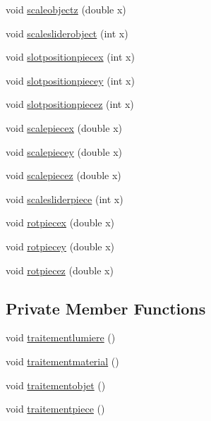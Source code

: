 \begin{DoxyCompactItemize}
void \hyperlink{class_mondock_a1f5430731565a79314d90de605741e75}{scaleobjectz} (double x)
\item 
void \hyperlink{class_mondock_a0b0dfd777e3a4ee9f4ac65ab44b02fca}{scalesliderobject} (int x)
\item 
void \hyperlink{class_mondock_aab1b5fe42325904c90cb7ea01d20dda3}{slotpositionpiecex} (int x)
\item 
void \hyperlink{class_mondock_aa9b2f07da91515f13c0dc217d24357ba}{slotpositionpiecey} (int x)
\item 
void \hyperlink{class_mondock_a655881c708869d768f1488d6fa066dc6}{slotpositionpiecez} (int x)
\item 
void \hyperlink{class_mondock_a9f2a071406501e4fccde215bc38d8df9}{scalepiecex} (double x)
\item 
void \hyperlink{class_mondock_a4ac3bc0b53096e41379ac7ef64de9d2d}{scalepiecey} (double x)
\item 
void \hyperlink{class_mondock_afd3ea421e6df4deac7930ed476556aa4}{scalepiecez} (double x)
\item 
void \hyperlink{class_mondock_aa2174033ee4e3798b0c800a2c92f958f}{scalesliderpiece} (int x)
\item 
void \hyperlink{class_mondock_a124312bbc80f593e1868bf0219cf0056}{rotpiecex} (double x)
\item 
void \hyperlink{class_mondock_a2e657947e69adddb4ee8527063377a31}{rotpiecey} (double x)
\item 
void \hyperlink{class_mondock_a8f94fe729819688c88de6025642463c9}{rotpiecez} (double x)
\end{DoxyCompactItemize}
\subsection*{Private Member Functions}
\begin{DoxyCompactItemize}
\item 
void \hyperlink{class_mondock_aea9fc6ea30f9958ac3a747552ecbed17}{traitementlumiere} ()
\item 
void \hyperlink{class_mondock_ab482a04624f22351da70e316fe9c8d4e}{traitementmaterial} ()
\item 
void \hyperlink{class_mondock_aad20b3c5334d00fe5e69ac5872f76f4b}{traitementobjet} ()
\item 
void \hyperlink{class_mondock_a8f0d8c5f390853f482b38bbcf943447a}{traitementpiece} ()
\end{DoxyCompactItemize}
